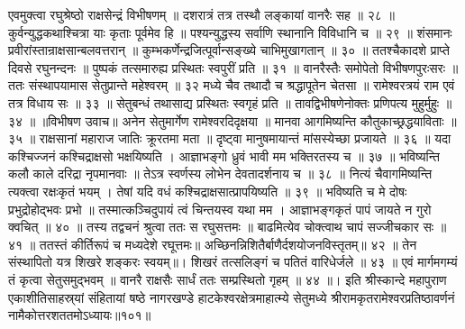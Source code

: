 एवमुक्त्वा रघुश्रेष्ठो राक्षसेन्द्रं विभीषणम् ॥
दशरात्रं तत्र तस्थौ लङ्कायां वानरैः सह ॥ २८ ॥
कुर्वन्युद्धकथाश्चित्रा याः कृताः पूर्वमेव हि ॥
पश्यन्युद्धस्य सर्वाणि स्थानानि विविधानि च ॥ २९ ॥
शंसमानः प्रवीरांस्तान्राक्षसान्बलवत्तरान् ॥
कुम्भकर्णेन्द्रजित्पूर्वान्सङ्ख्ये चाभिमुखागतान् ॥ ३० ॥
ततश्चैकादशे प्राप्ते दिवसे रघुनन्दनः ॥
पुष्पकं तत्समारुह्य प्रस्थितः स्वपुरीं प्रति ॥ ३१ ॥
वानरैस्तैः समोपेतो विभीषणपुरःसरः ॥
ततः संस्थापयामास सेतुप्रान्ते महेश्वरम् ॥ ३२
मध्ये चैव तथादौ च श्रद्धापूतेन चेतसा ॥
रामेश्वरत्रयं राम एवं तत्र विधाय सः ॥ ३३ ॥
सेतुबन्धं तथासाद्य प्रस्थितः स्वगृहं प्रति ॥
तावद्विभीषणेनोक्तः प्रणिपत्य मुहुर्मुहुः ॥ ३४ ॥
॥विभीषण उवाच॥
अनेन सेतुमार्गेण रामेश्वरदिदृक्षया ॥
मानवा आगमिष्यन्ति कौतुकाच्छ्रद्धयाविताः ॥ ३५ ॥
राक्षसानां महाराज जातिः क्रूरतमा मता ॥
दृष्ट्वा मानुषमायान्तं मांसस्येच्छा प्रजायते ॥ ३६ ॥
यदा कश्चिज्जनं कश्चिद्राक्षसो भक्षयिष्यति ।
आज्ञाभङ्गो ध्रुवं भावी मम भक्तिरतस्य च ॥ ३७ ॥
भविष्यन्ति कलौ काले दरिद्रा नृपमानवाः ॥
तेऽत्र स्वर्णस्य लोभेन देवतादर्शनाय च ॥ ३८ ॥
नित्यं चैवागमिष्यन्ति त्यक्त्वा रक्षःकृतं भयम् ।
तेषां यदि वधं कश्चिद्राक्षसात्प्रापयिष्यति ॥ ३९ ॥
भविष्यति च मे दोषः प्रभुद्रोहोद्भवः प्रभो ॥
तस्मात्कञ्चिदुपायं त्वं चिन्तयस्व यथा मम ।
आज्ञाभङ्गकृतं पापं जायते न गुरो क्वचित् ॥ ४० ॥
तस्य तद्वचनं श्रुत्वा ततः स रघुसत्तमः ॥
बाढमित्येव चोक्त्वाथ चापं सज्जीचकार सः ॥ ४१ ॥
ततस्तं कीर्तिरूपं च मध्यदेशे रघूत्तमः॥
अच्छिनन्निशितैर्बाणैर्दशयोजनविस्तृतम्॥ ४२ ॥
तेन संस्थापितो यत्र शिखरे शङ्करः स्वयम्॥।
शिखरं तत्सलिङ्गं च पतितं वारिधेर्जले ॥ ४३ ॥
एवं मार्गमगम्यं तं कृत्वा सेतुसमुद्भवम् ॥
वानरै राक्षसैः सार्धं ततः सम्प्रस्थितो गृहम् ॥ ४४ ॥।
इति श्रीस्कान्दे महापुराण एकाशीतिसाहस्र्यां संहितायां षष्ठे नागरखण्डे हाटकेश्वरक्षेत्रमाहात्म्ये सेतुमध्ये श्रीरामकृतरामेश्वरप्रतिष्ठावर्णनं नामैकोत्तरशततमोऽध्यायः॥१०१॥


